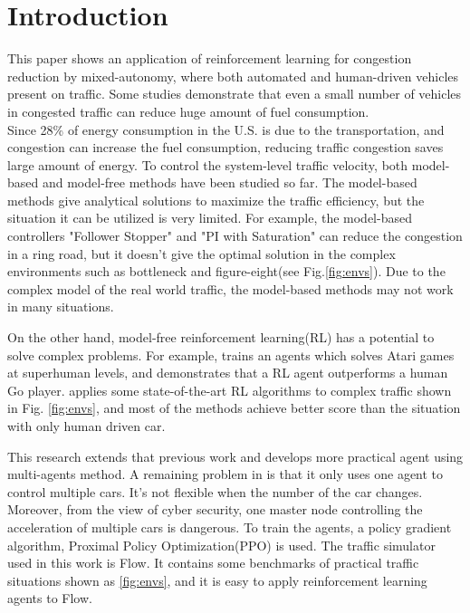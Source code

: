 \section{Introduction\label{introduction}}

This paper shows an application of reinforcement learning for congestion reduction by mixed-autonomy, where both automated and human-driven vehicles present on traffic\cite{Wu:EECS-2018-132}. Some studies demonstrate that even a small number of vehicles in congested traffic can reduce huge amount of fuel consumption\cite{Wu:EECS-2018-132}.\\
Since 28\% of energy consumption in the U.S. is due to the transportation\cite{U.S.EnergyInformationAdministration2017}, and congestion can increase the fuel consumption\cite{Treiber2008}, reducing traffic congestion saves large amount of energy. 
To control the system-level traffic velocity, both model-based and model-free methods have been studied so far. The model-based methods give analytical solutions to maximize the traffic efficiency, but the situation it can be utilized is very limited. For example, the model-based controllers "Follower Stopper" and "PI with Saturation" \cite{Stern2018} can reduce the congestion in a ring road, but it doesn't give the optimal solution in the complex environments such as bottleneck and figure-eight(see Fig.\ref{fig:envs}). Due to the complex model of the real world traffic, the model-based methods may not work in many situations. 

On the other hand, model-free reinforcement learning(RL) has a potential to solve complex problems. For example, \cite{Mnih2013} trains an agents which solves Atari games at superhuman levels, and \cite{Silver2017} demonstrates that a RL agent outperforms a human Go player. \cite{Vinitsky2018} applies some state-of-the-art RL algorithms to complex traffic shown in Fig. \ref{fig:envs}, and most of the methods achieve better score than the situation with only human driven car. 

This research extends that previous work\cite{Kreidieh2018} and develops more practical agent using multi-agents method. A remaining problem in \cite{Kreidieh2018} is that it only uses one agent to control multiple cars. It's not flexible when the number of the car changes. Moreover, from the view of cyber security, one master node controlling the acceleration of multiple cars is dangerous. To train the agents, a policy gradient algorithm, Proximal Policy Optimization(PPO)\cite{Schulman2017} is used. The traffic simulator used in this work is Flow\cite{Wu2017}. It contains some benchmarks of practical traffic situations shown as \ref{fig:envs}, and it is easy to apply reinforcement learning agents to Flow. 

